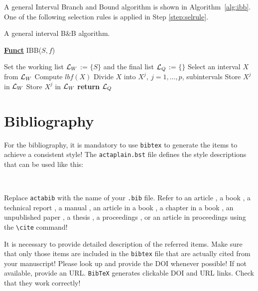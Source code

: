 \documentclass[theoremcontinuousnumbering,withtitlethanks]{actacyb}
\begin{document}
A general Interval Branch and Bound algorithm is shown in Algorithm~\ref{alg:ibb}. One of the following selection rules is applied in Step \ref{step:selrule}.

\begin{algorithm}[ht!]
\caption{ A general interval B\&B algorithm.} 
\label{alg:ibb} 
\textbf{\underline{Funct}} IBB($S,f$)
\renewcommand{\algorithmiccomment}[1]{\hfill {\it #1}}
\begin{algorithmic}[1]
\STATE Set the working list ${\cal L}_W$ := $\{S\}$ and the final list ${\cal L}_Q$ := $\{\}$     
 \label{alg:igoend}
  \STATE  Select an interval $X$ from ${\cal L}_W$ \label{step:selrule}  
  \STATE Compute $lbf(X)$ 		  
    \STATE Divide $X$ into $X^j,\ j=1,\dots, p$, subintervals   
        \STATE Store $X^j$ in ${\cal L}_W$ 
      \ELSE
        \STATE Store $X^j$ in ${\cal L}_W$ 
      \ENDIF
    \ENDFOR  
  \ENDIF
\ENDWHILE
\STATE \textbf{return} ${\cal L}_Q$
\end{algorithmic}
\end{algorithm}


\section{Bibliography}
For the bibliography, it is mandatory to use \verb|bibtex| to generate the items to achieve a consistent style!
The \verb|actaplain.bst| file defines the style descriptions that can be used like this:

\begin{verbatim}


\end{verbatim}

Replace {\tt actabib} with the name of your {\tt .bib} file.
Refer to an article \cite{ratz99nonsmooth}, a book \cite{Klatte1993a}, a technical report \cite{ratz96optimized}, a manual \cite{T3D},
an article in a book \cite{Fuchi1996a}, a chapter in a book \cite{CORR96}, an unpublished paper \cite{jamartin}, a thesis \cite{braune-diss}, a proceedings \cite{griewank-proceedings}, or an article in proceedings \cite{alefeld-survey} using the \verb|\cite| command!

It is necessary to provide detailed description of the referred items.
Make sure that only those items are included in the \verb|bibtex| file that are actually cited from your manuscript!
Please look up and provide the DOI whenever possible! If not available, provide an URL.
\verb|BibTeX| generates clickable DOI and URL links. Check that they work correctly!

{


}
\end{document}
